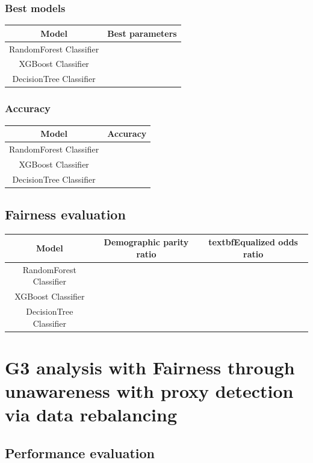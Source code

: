 \documentclass[12pt,a4paper,openright,twoside]{book}
\begin{document}
\subsubsection{Best models}

\begin{tabular}{|c|c|}
    \hline
    \textbf{Model} & \textbf{Best parameters} \\
    \hline
    RandomForest Classifier  &  \\
    \hline
    XGBoost Classifier & \\
    \hline
    DecisionTree Classifier & \\
    \hline
\end{tabular}

\subsubsection{Accuracy}

\begin{tabular}{|c|c|}
    \hline
    \textbf{Model} & \textbf{Accuracy} \\ 
    \hline
    RandomForest Classifier  &  \\
    \hline
    XGBoost Classifier & \\
    \hline
    DecisionTree Classifier & \\ 
    \hline
\end{tabular}

\subsection{Fairness evaluation}

\begin{tabular}{|c|c|c|}
    \hline
    \textbf{Model} & \textbf{Demographic parity ratio} & textbf{Equalized odds ratio} \\
    \hline
    RandomForest Classifier & & \\
    \hline
    XGBoost Classifier & & \\
    \hline
    DecisionTree Classifier & & \\
    \hline
\end{tabular}


\section{G3 analysis with Fairness through unawareness with proxy detection via data rebalancing}

\subsection{Performance evaluation}
\end{document}
